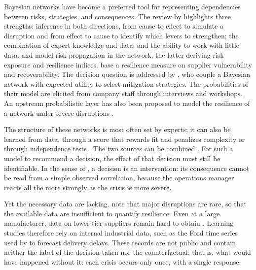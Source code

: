Bayesian networks have become a preferred tool for representing dependencies between risks, strategies, and consequences. The review by \citet{hosseiniivanov2020} highlights three strengths: inference in both directions, from cause to effect to simulate a disruption and from effect to cause to identify which levers to strengthen; the combination of expert knowledge and data; and the ability to work with little data. \citet{garvey2015} and \citet{ojha2018} model risk propagation in the network, the latter deriving risk exposure and resilience indices. \citet{hosseiniivanov2022aor} base a resilience measure on supplier vulnerability and recoverability. The decision question is addressed by \citet{qazi2018}, who couple a Bayesian network with expected utility to select mitigation strategies. The probabilities of their model are elicited from company staff through interviews and workshops. An upstream probabilistic layer has also been proposed to model the resilience of a network under severe disruptions \citep{rahiel2026codit}.

The structure of these networks is most often set by experts; it can also be learned from data, through a score that rewards fit and penalizes complexity or through independence tests \citep{koller2009, hosseiniivanov2020}. The two sources can be combined \citep{heckerman1995}. For such a model to recommend a decision, the effect of that decision must still be identifiable. In the sense of \citet{pearl2009}, a decision is an intervention: its consequence cannot be read from a simple observed correlation, because the operations manager reacts all the more strongly as the crisis is more severe.

Yet the necessary data are lacking. \citet{hosseiniivanov2020} note that major disruptions are rare, so that the available data are insufficient to quantify resilience. Even at a large manufacturer, data on lower-tier suppliers remain hard to obtain \citep{simchilevi2015}. Learning studies therefore rely on internal industrial data, such as the Ford time series used by \citet{do2024} to forecast delivery delays. These records are not public and contain neither the label of the decision taken nor the counterfactual, that is, what would have happened without it: each crisis occurs only once, with a single response.

